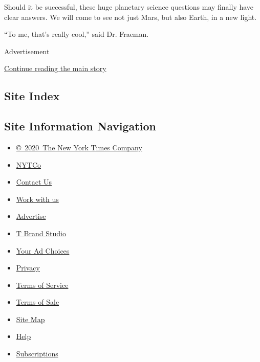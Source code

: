 Should it be successful, these huge planetary science questions may
finally have clear answers. We will come to see not just Mars, but also
Earth, in a new light.

``To me, that's really cool,'' said Dr. Fraeman.

Advertisement

\protect\hyperlink{after-bottom}{Continue reading the main story}

\hypertarget{site-index}{%
\subsection{Site Index}\label{site-index}}

\hypertarget{site-information-navigation}{%
\subsection{Site Information
Navigation}\label{site-information-navigation}}

\begin{itemize}
\tightlist
\item
  \href{https://help.nytimes3xbfgragh.onion/hc/en-us/articles/115014792127-Copyright-notice}{©~2020~The
  New York Times Company}
\end{itemize}

\begin{itemize}
\tightlist
\item
  \href{https://www.nytco.com/}{NYTCo}
\item
  \href{https://help.nytimes3xbfgragh.onion/hc/en-us/articles/115015385887-Contact-Us}{Contact
  Us}
\item
  \href{https://www.nytco.com/careers/}{Work with us}
\item
  \href{https://nytmediakit.com/}{Advertise}
\item
  \href{http://www.tbrandstudio.com/}{T Brand Studio}
\item
  \href{https://www.nytimes3xbfgragh.onion/privacy/cookie-policy\#how-do-i-manage-trackers}{Your
  Ad Choices}
\item
  \href{https://www.nytimes3xbfgragh.onion/privacy}{Privacy}
\item
  \href{https://help.nytimes3xbfgragh.onion/hc/en-us/articles/115014893428-Terms-of-service}{Terms
  of Service}
\item
  \href{https://help.nytimes3xbfgragh.onion/hc/en-us/articles/115014893968-Terms-of-sale}{Terms
  of Sale}
\item
  \href{https://spiderbites.nytimes3xbfgragh.onion}{Site Map}
\item
  \href{https://help.nytimes3xbfgragh.onion/hc/en-us}{Help}
\item
  \href{https://www.nytimes3xbfgragh.onion/subscription?campaignId=37WXW}{Subscriptions}
\end{itemize}
